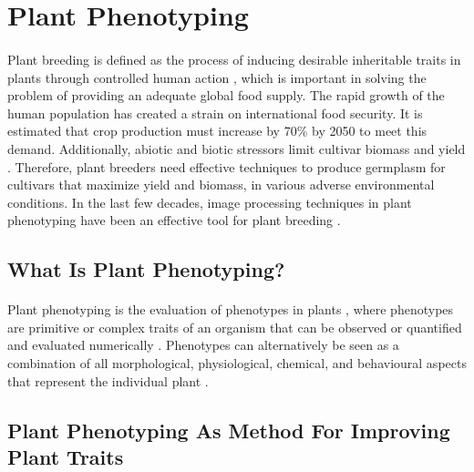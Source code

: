 \section{Plant Phenotyping}

\paragraph{}
Plant breeding is defined as the process of inducing desirable inheritable traits in plants through controlled human action \cite{ortonIntroduction2020}, which is important in solving the problem of providing an adequate global food supply. The rapid growth of the human population has created a strain on international food security. It is estimated that crop production must increase by 70\% by 2050 \cite{carvajal-yepesGlobalSurveillanceSystem2019} to meet this demand. Additionally, abiotic and biotic stressors limit cultivar biomass and yield \cite{grimeEvidenceExistenceThree1997}. Therefore, plant breeders need effective techniques to produce germplasm for cultivars that maximize yield and biomass, in various adverse environmental conditions. In the last few decades, image processing techniques in plant phenotyping have been an effective tool for plant breeding \cite{anandBreedingTechniquesDispense2023}.

\subsection{What Is Plant Phenotyping?}

\paragraph{}
Plant phenotyping is the evaluation of phenotypes in plants \cite{fioraniFutureScenariosPlant2013}, where phenotypes are primitive or complex traits of an organism that can be observed or quantified and evaluated numerically \cite{johannsenGenotypeConceptionHeredity1911a}.  Phenotypes can alternatively be seen as a combination of all morphological, physiological, chemical, and behavioural aspects that represent the individual plant \cite{guoPhenotypingPlants2014, mohammedReviewPlantPhenotyping2025, liReviewImagingTechniques2014}. 

\subsection{Plant Phenotyping As Method For Improving Plant Traits}

